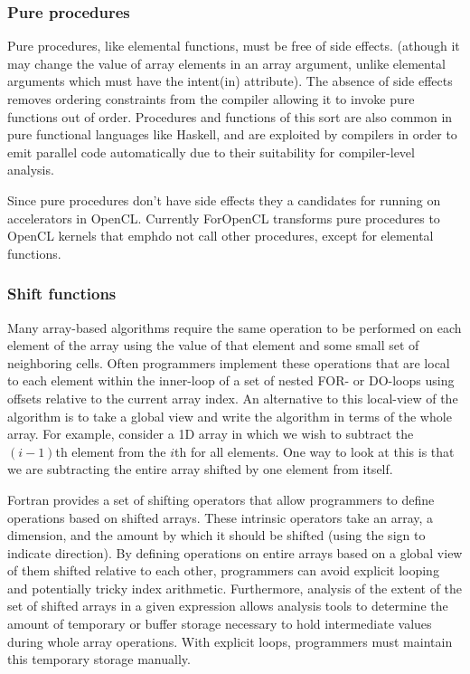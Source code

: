 \documentclass[10pt, conference, compsocconf]{IEEEtran}
\begin{document}
\subsubsection*{Pure procedures}

Pure procedures, like elemental functions, must be free of side effects.
(athough it may change the value of array elements in an array argument,
unlike elemental arguments which must have the intent(in) attribute).
The absence of side effects removes ordering constraints from the compiler
allowing it to invoke pure functions out of order.  Procedures and functions
of this sort are also common in pure functional languages like Haskell,
and are exploited by compilers in order to emit parallel code automatically
due to their suitability for compiler-level analysis.

Since pure procedures don't have side effects they a candidates for running on
accelerators in OpenCL.  Currently ForOpenCL transforms pure procedures to
OpenCL kernels that emph{do not} call other procedures, except for elemental
functions.

\subsubsection*{Shift functions}

Many array-based algorithms require the same operation to be performed
on each element of the array using the value of that element and some small
set of neighboring cells.  Often programmers implement these operations that
are local to each element within the inner-loop of a set of nested FOR-
or DO-loops using offsets relative to the current array index.  An alternative
to this local-view of the algorithm is to take a global view and write the
algorithm in terms of the whole array.  For example, consider a 1D array in
which we wish to subtract the $(i-1)$th element from the $i$th for all
elements.  One way to look at this is that we are subtracting the entire array
shifted by one element from itself.

Fortran provides a set of shifting operators that allow programmers to
define operations based on shifted arrays.  These intrinsic operators take
an array, a dimension, and the amount by which it should be shifted (using
the sign to indicate direction).  By defining operations on entire arrays
based on a global view of them shifted relative to each other, programmers can
avoid explicit looping and potentially tricky index arithmetic.  Furthermore,
analysis of the extent of the set of shifted arrays in a given expression
allows analysis tools to determine the amount of temporary or buffer storage
necessary to hold intermediate values during whole array operations.  With
explicit loops, programmers must maintain this temporary storage manually.
\end{document}
